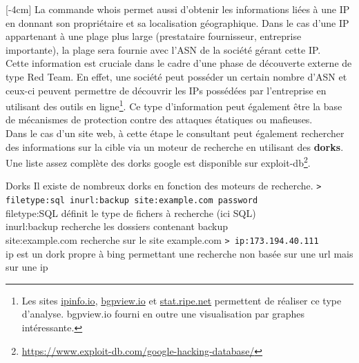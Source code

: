 \documentclass[twoside,a4paper,12pt,titlepage]{book}
\newcommand{\MarginPar}[2]{\marginnote{\scriptsize #1}[#2]}
\begin{document}
\MarginPar{\textbf{Whois}: Pour contôler le possesseur de la cible}{-4cm}
La commande whois permet aussi d'obtenir les informations liées à une IP en donnant son propriétaire et sa localisation géographique. Dans le cas d'une IP appartenant à une plage plus large (prestataire fournisseur, entreprise importante), la plage sera fournie avec l'\gls{ASN} de la société gérant cette IP. \\
Cette information est cruciale dans le cadre d'une phase de découverte externe de type Red Team. En effet, une société peut posséder un certain nombre d'ASN et ceux-ci peuvent permettre de découvrir les IPs possédées par l'entreprise en utilisant des outils en ligne\footnote{Les sites \url{ipinfo.io}, \url{bgpview.io} et \url{stat.ripe.net} permettent de réaliser ce type d'analyse. bgpview.io fourni en outre une visualisation par graphes intéressante.}. Ce type d'information peut également être la base de mécanismes de protection contre des attaques étatiques ou mafieuses.\\
Dans le cas d'un site web, à cette étape le consultant peut également rechercher des informations sur la cible via un moteur de recherche en utilisant des \textbf{\gls{dorks}}. Une liste assez complète des dorks google est disponible sur exploit-db\footnote{\url{https://www.exploit-db.com/google-hacking-database/}}.\\
\begin{FlagConsole}{Dorks}
	Il existe de nombreux dorks en fonction des moteurs de recherche.
	\texttt{> filetype:sql inurl:backup site:example.com password}\\
	filetype:SQL définit le type de fichers à recherche (ici SQL)\\
	inurl:backup recherche les dossiers contenant backup\\
	site:example.com recherche sur le site example.com
	\texttt{> ip:173.194.40.111}\\
	ip est un dork propre à bing permettant une recherche non basée sur une url mais sur une ip
\end{FlagConsole}
\end{document}
